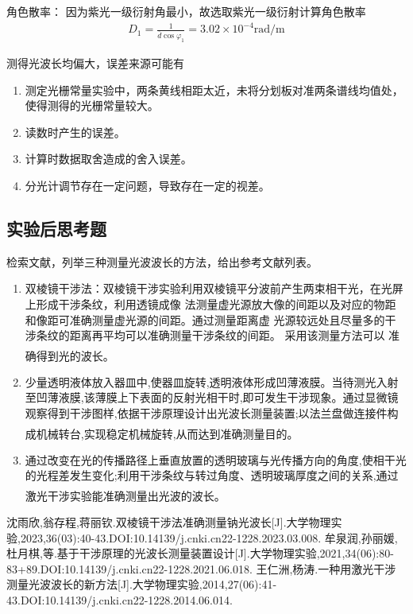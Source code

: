 \documentclass[dvipsnames, svgnames,a4paper,11pt]{article}
\newcommand{\upcite}[1]{\textsuperscript{\textsuperscript{\cite{#1}}}}
\begin{document}
 \noindent 角色散率：
因为紫光一级衍射角最小，故选取紫光一级衍射计算角色散率
 \begin{align*}
	D_1=\frac{1}{\overline{d}\cos\varphi_1}=3.02\times10^{-4}\text{rad/m}
 \end{align*}

 测得光波长均偏大，误差来源可能有\begin{enumerate}
	\item 测定光栅常量实验中，两条黄线相距太近，未将分划板对准两条谱线均值处，使得测得的光栅常量较大。
	\item 读数时产生的误差。
	\item 计算时数据取舍造成的舍入误差。
	\item 分光计调节存在一定问题，导致存在一定的视差。
 \end{enumerate}
\subsection{实验后思考题}
\begin{question}
	检索文献，列举三种测量光波波长的方法，给出参考文献列表。
	\tcblower
	\begin{enumerate}
		\item 双棱镜干涉法：双棱镜干涉实验利用双棱镜平分波前产生两束相干光，在光屏上形成干涉条纹，利用透镜成像
		法测量虚光源放大像的间距以及对应的物距和像距可准确测量虚光源的间距。通过测量距离虚
		光源较远处且尽量多的干涉条纹的距离再平均可以准确测量干涉条纹的间距。 采用该测量方法可以
		准确得到光的波长。\upcite{ref1}
		\item 少量透明液体放入器皿中,使器皿旋转,透明液体形成凹薄液膜。当待测光入射至凹薄液膜,该薄膜上下表面的反射光相干时,即可发生干涉现象。通过显微镜观察得到干涉图样,依据干涉原理设计出光波长测量装置;以法兰盘做连接件构成机械转台,实现稳定机械旋转,从而达到准确测量目的。\upcite{ref2}
		\item 通过改变在光的传播路径上垂直放置的透明玻璃与光传播方向的角度,使相干光的光程差发生变化;利用干涉条纹与转过角度、透明玻璃厚度之间的关系,通过激光干涉实验能准确测量出光波的波长。\upcite{ref3}
	\end{enumerate}
\end{question}
\clearpage
{}


\begin{thebibliography}{9}
	 沈雨欣,翁存程,蒋丽钦.双棱镜干涉法准确测量钠光波长[J].大学物理实验,2023,36(03):40-43.DOI:10.14139/j.cnki.cn22-1228.2023.03.008.
	 牟泉润,孙丽媛,杜月棋,等.基于干涉原理的光波长测量装置设计[J].大学物理实验,2021,34(06):80-83+89.DOI:10.14139/j.cnki.cn22-1228.2021.06.018.
	 王仁洲,杨涛.一种用激光干涉测量光波波长的新方法[J].大学物理实验,2014,27(06):41-43.DOI:10.14139/j.cnki.cn22-1228.2014.06.014.
\end{thebibliography}
\end{document}
